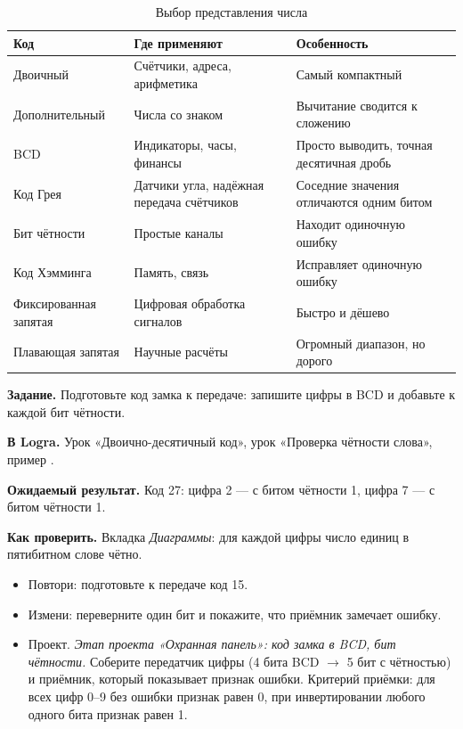 \begin{table}[H]
\centering
\caption{Выбор представления числа}
\small
\begin{tabularx}{\textwidth}{l X X}
\toprule
\textbf{Код} & \textbf{Где применяют} & \textbf{Особенность} \\
\midrule
Двоичный & Счётчики, адреса, арифметика & Самый компактный \\
Дополнительный & Числа со знаком & Вычитание сводится к сложению \\
BCD & Индикаторы, часы, финансы & Просто выводить, точная десятичная дробь \\
Код Грея & Датчики угла, надёжная передача счётчиков & Соседние значения отличаются одним битом \\
Бит чётности & Простые каналы & Находит одиночную ошибку \\
Код Хэмминга & Память, связь & Исправляет одиночную ошибку \\
Фиксированная запятая & Цифровая обработка сигналов & Быстро и дёшево \\
Плавающая запятая & Научные расчёты & Огромный диапазон, но дорого \\
\bottomrule
\end{tabularx}
\end{table}

\begin{diybox}
\textbf{Задание.} Подготовьте код замка к передаче: запишите цифры в BCD и
добавьте к каждой бит чётности.\par
\textbf{В Logra.} Урок «Двоично-десятичный код», урок «Проверка чётности слова»,
пример .\par
\textbf{Ожидаемый результат.} Код 27: цифра 2 ---  с битом
чётности 1, цифра 7 ---  с битом чётности 1.\par
\textbf{Как проверить.} Вкладка \emph{Диаграммы}: для каждой цифры число
единиц в пятибитном слове чётно.
\begin{itemize}[leftmargin=3.4em,labelwidth=3em,labelsep=0.4em,align=left]
  \item[\stars{1}] Повтори: подготовьте к передаче код 15.
  \item[\stars{2}] Измени: переверните один бит и покажите, что приёмник
    замечает ошибку.
  \item[\stars{3}] Проект. \emph{Этап проекта «Охранная панель»: код замка в BCD,
    бит чётности.} Соберите передатчик цифры (4 бита BCD $\to$ 5 бит с
    чётностью) и приёмник, который показывает признак ошибки. Критерий
    приёмки: для всех цифр 0--9 без ошибки признак равен 0, при
    инвертировании любого одного бита признак равен 1.
\end{itemize}
\end{diybox}

